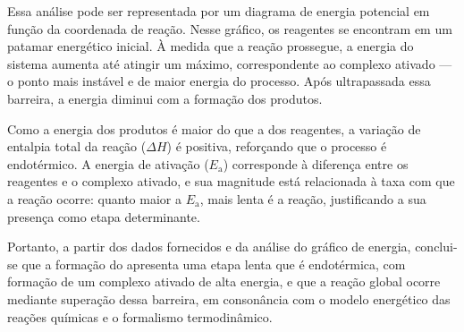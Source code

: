 
Essa análise pode ser representada por um diagrama de energia potencial em função da coordenada de reação. Nesse gráfico, os reagentes se encontram em um patamar energético inicial. À medida que a reação prossegue, a energia do sistema aumenta até atingir um máximo, correspondente ao complexo ativado — o ponto mais instável e de maior energia do processo. Após ultrapassada essa barreira, a energia diminui com a formação dos produtos.

Como a energia dos produtos é maior do que a dos reagentes, a variação de entalpia total da reação (\(\Delta H\)) é positiva, reforçando que o processo é endotérmico. A energia de ativação (\(E_\text{a}\)) corresponde à diferença entre os reagentes e o complexo ativado, e sua magnitude está relacionada à taxa com que a reação ocorre: quanto maior a \(E_\text{a}\), mais lenta é a reação, justificando a sua presença como etapa determinante.

Portanto, a partir dos dados fornecidos e da análise do gráfico de energia, conclui-se que a formação do  apresenta uma etapa lenta que é endotérmica, com formação de um complexo ativado de alta energia, e que a reação global ocorre mediante superação dessa barreira, em consonância com o modelo energético das reações químicas e o formalismo termodinâmico.
